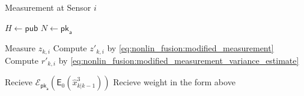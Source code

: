 \begin{algorithm}[htbp]
\caption{Measurement at Sensor $i$}\label{alg:nonlin_fusion:sen_measurement}
\begin{algorithmic}[1]
    \State $H \gets \mathsf{pub}$
    \State $N \gets \mathsf{pk}_{\mathsf{a}}$

    \State Measure $z_{k,i}$
    \State Compute $z'_{k,i}$ by \eqref{eq:nonlin_fusion:modified_measurement}
    \State Compute $r'_{k,i}$ by \eqref{eq:nonlin_fusion:modified_measurement_variance_estimate}

    \State Recieve $\mathcal{E}_{\mathsf{pk}_{\mathsf{a}}}\left(\mathsf{E}_{0}\left(\hat{x}^3_{k|k-1}\right)\right)$
        \State Recieve weight in the form above
    \EndFor


\end{algorithmic}
\end{algorithm}
